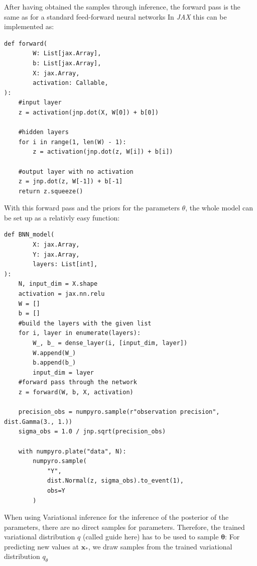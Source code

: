 \documentclass{article}
\begin{document}
After having obtained the samples through inference, the forward pass is the same as for a standard feed-forward neural networks
In \textit{JAX} this can be implemented as:
\begin{lstlisting}[caption= {Feed forward Neural Network},captionpos=t]
def forward(
        W: List[jax.Array],
        b: List[jax.Array],
        X: jax.Array,
        activation: Callable,
):
    #input layer
    z = activation(jnp.dot(X, W[0]) + b[0])

    #hidden layers
    for i in range(1, len(W) - 1):
        z = activation(jnp.dot(z, W[i]) + b[i])

    #output layer with no activation
    z = jnp.dot(z, W[-1]) + b[-1]
    return z.squeeze()
\end{lstlisting} 
With this forward pass and the priors for the parameters $\theta$, the whole model can be set up as a relativly easy function:
\begin{lstlisting}[caption={NumPyro model for baysian deep neural network},captionpos=t]
def BNN_model(
        X: jax.Array,
        Y: jax.Array,
        layers: List[int],
):
    N, input_dim = X.shape
    activation = jax.nn.relu
    W = []
    b = []
    #build the layers with the given list
    for i, layer in enumerate(layers):
        W_, b_ = dense_layer(i, [input_dim, layer])
        W.append(W_)
        b.append(b_)
        input_dim = layer
    #forward pass through the network
    z = forward(W, b, X, activation)
    
    precision_obs = numpyro.sample(r"observation precision", dist.Gamma(3., 1.))
    sigma_obs = 1.0 / jnp.sqrt(precision_obs)

    with numpyro.plate("data", N):
        numpyro.sample(
            "Y", 
            dist.Normal(z, sigma_obs).to_event(1), 
            obs=Y
        )
\end{lstlisting}
When using Variational inference for the inference of the posterior of the parameters, there are no direct samples for parameters. Therefore, the trained variational distribution $q$ (called guide here) has to be used to sample $\bm \theta$:
For predicting new values at $\bm x_*$, we draw samples from the trained variational distribution $q_\theta $
\end{document}
